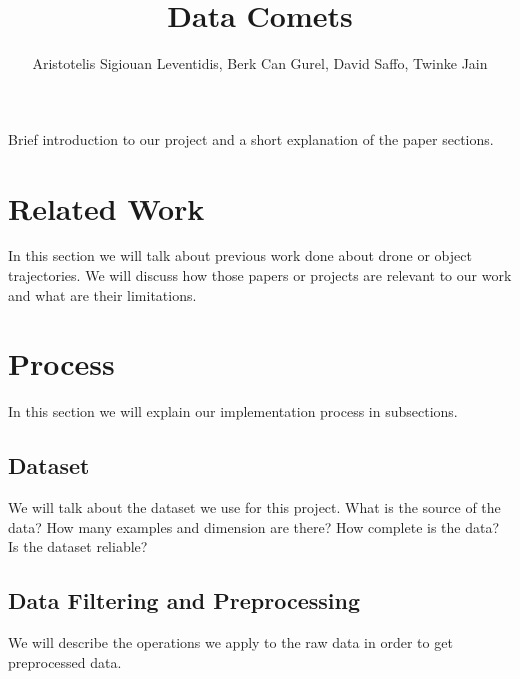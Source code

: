\documentclass[journal]{vgtc}                %
\title{Data Comets}
\author{Aristotelis Sigiouan Leventidis, Berk Can Gurel, David Saffo, Twinke Jain}
\begin{document}


\maketitle

Brief introduction to our project and a short explanation of the paper sections.

\section{Related Work}

In this section we will talk about previous work done about drone or object trajectories. We will discuss how those papers or projects are relevant to our work and what are their limitations.

\section{Process}

In this section we will explain our implementation process in subsections.

	\subsection{Dataset}
	
	We will talk about the dataset we use for this project. What is the source of the data? How many examples and dimension are there? How complete is the data? Is the dataset reliable?
	
	\subsection{Data Filtering and Preprocessing}
	
	We will describe the operations we apply to the raw data in order to get preprocessed data.
	
\end{document}
